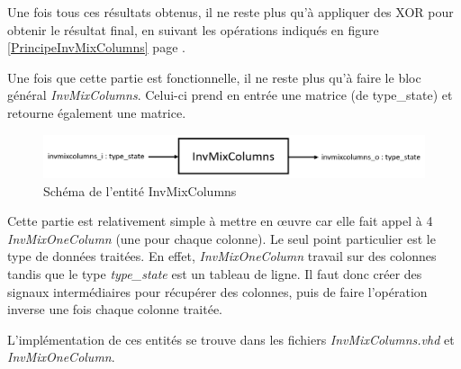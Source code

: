 \documentclass[a4paper, 12pt]{article}
\begin{document}
Une fois tous ces résultats obtenus, il ne reste plus qu'à appliquer des XOR pour obtenir le résultat final, en suivant les opérations indiqués en figure \ref{PrincipeInvMixColumns} page \pageref{PrincipeInvMixColumns}.
\par Une fois que cette partie est fonctionnelle, il ne reste plus qu'à faire le bloc général \emph{InvMixColumns}. Celui-ci prend en entrée une matrice (de type\_state) et retourne également une matrice. 
			\begin{figure}[H]
				\begin{center}
				\includegraphics[scale=0.4]{Images/InvMixColumnsEntity.png}
				\end{center}
				\caption{Schéma de l'entité InvMixColumns}
				\label{InvMixColumnsEntity}
			\end{figure}
\par Cette partie est relativement simple à mettre en œuvre car elle fait appel à 4 \emph{InvMixOneColumn} (une pour chaque colonne). Le seul point particulier est le type de données traitées. En effet, \emph{InvMixOneColumn} travail sur des colonnes tandis que le type \emph{type\_state} est un tableau de ligne. Il faut donc créer des signaux intermédiaires pour récupérer des colonnes, puis de faire l'opération inverse une fois chaque colonne traitée. 

	L'implémentation de ces entités se trouve dans les fichiers \emph{InvMixColumns.vhd} et \emph{InvMixOneColumn}.
		
\end{document}
